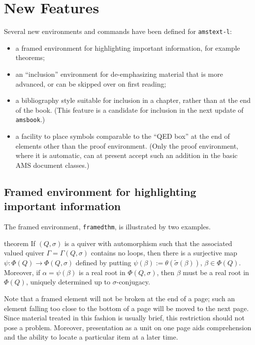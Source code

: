 \documentclass[multixcb]{amstext-l}
\theoremstyle{plain}
\theoremstyle{definition}
\begin{document}

\chapter{New Features}

Several new environments and commands have been defined for
\texttt{amstext-l}:
\begin{itemize}
\item a framed environment for highlighting important
  information, for example theorems;
\item an ``inclusion'' environment for de-emphasizing material
  that is more advanced, or can be skipped over on first reading;
\item a bibliography style suitable for inclusion in a chapter,
  rather than at the end of the book.  (This feature is a candidate
  for inclusion in the next update of \texttt{amsbook}.)
\item a facility to place symbols comparable to the ``QED box'' at
  the end of elements other than the proof environment.  (Only the
  proof environment, where it is automatic, can at present accept
  such an addition in the basic AMS document classes.)
\end{itemize}

\section{Framed environment for highlighting important information}

The framed environment, \verb+framedthm+, is illustrated by two examples.

\begin{framedthm}{theorem}
If $(Q,\sigma)$ is a quiver with automorphism such that the
associated valued quiver $\Gamma=\Gamma(Q,\sigma)$ contains no
loops, then there is a surjective map $\psi\colon
\Phi(Q)\to\Phi(Q,\sigma)$ defined by putting $\psi(\beta):=
\theta(\tilde\sigma(\beta))$, $\beta\in\Phi(Q)$. Moreover, if
$\alpha=\psi(\beta)$ is a real root in $\Phi(Q,\sigma)$, then
$\beta$ must be a real root in $\Phi(Q)$, uniquely determined up
to $\sigma$-conjugacy.
\end{framedthm}

Note that a framed element will not be broken at the end of a
page; such an element falling too close to the bottom of a page
will be moved to the next page.  Since material treated in this
fashion is usually brief, this restriction should not pose a
problem.  Moreover, presentation as a unit on one
page aids comprehension and the ability to locate a particular
item at a later time.
\end{document}
